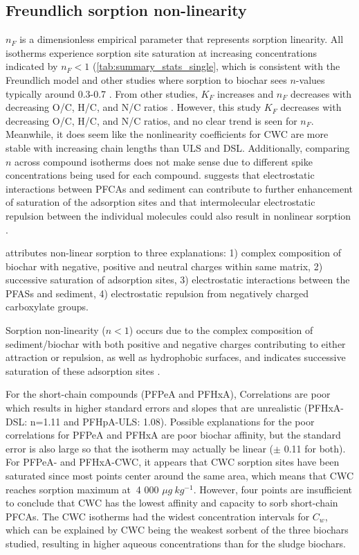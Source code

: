 \subsection{Freundlich sorption non-linearity}
$n_F$ is a dimensionless empirical parameter that represents sorption linearity. All isotherms experience sorption site saturation at increasing concentrations indicated by $n_F<1 $ (\cref{tab:summary_stats_single}, which is consistent with the Freundlich model and other studies where sorption to biochar sees $n$-values typically around 0.3-0.7 \citep{Cornelissen2005}. From other studies, $K_F$ increases and $n_F$ decreases with decreasing O/C, H/C, and N/C ratios \citep{Cornelissen2005}. However, this study $K_F$ decreases with decreasing O/C, H/C, and N/C ratios, and no clear trend is seen for $n_F$. Meanwhile, it does seem like the nonlinearity coefficients for CWC are more stable with increasing chain lengths than ULS and DSL. Additionally, comparing $n$ across compound isotherms does not make sense due to different spike concentrations being used for each compound. \citep{yin2022insights} suggests that electrostatic interactions between PFCAs and sediment can contribute to further enhancement of saturation of the adsorption sites and that intermolecular electrostatic repulsion between the individual molecules could also result in nonlinear sorption \citep{higgins2006sorption,yin2022insights}.

\citep{yin2022insights} attributes non-linear sorption to three explanations: 1) complex composition of biochar with negative, positive and neutral charges within same matrix, 2) successive saturation of adsorption sites, 3) electrostatic interactions between the PFASs and sediment, 4) electrostatic repulsion from negatively charged carboxylate groups. 

Sorption non-linearity ($n<1$) occurs due to the complex composition of sediment/biochar with both positive and negative charges contributing to either attraction or repulsion, as well as hydrophobic surfaces, and indicates successive saturation of these adsorption sites \citep{yin2022insights}.  

For the short-chain compounds (PFPeA and PFHxA), Correlations are poor which results in higher standard errors and slopes that are unrealistic (PFHxA-DSL: n=1.11 and PFHpA-ULS: 1.08). Possible explanations for the poor correlations for PFPeA and PFHxA are poor biochar affinity, but the standard error is also large so that the isotherm may actually be linear ($\pm$ 0.11 for both). For PFPeA- and PFHxA-CWC, it appears that CWC sorption sites have been saturated since most points center around the same area, which means that CWC reaches sorption maximum at $~$4 000 $\mu g~kg^{-1}$. However, four points are insufficient to conclude that CWC has the lowest affinity and capacity to sorb short-chain PFCAs. The CWC isotherms had the widest concentration intervals for $C_w$, which can be explained by CWC being the weakest sorbent of the three biochars studied, resulting in higher aqueous concentrations than for the sludge biochars. 

